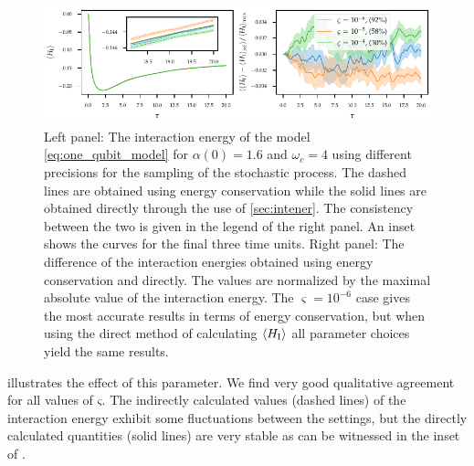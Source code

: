 \begin{figure}[htp]
  \centering
  \includegraphics{figs/one_bath_syst/stocproc_systematics_interaction}
  \caption{\label{fig:stocproc_systematics} Left panel: The
    interaction energy of the model \cref{eq:one_qubit_model} for
    \(α(0)=1.6\) and \(ω_c=4\) using different precisions for the
    sampling of the stochastic process. The dashed lines are obtained
    using energy conservation while the solid lines are obtained
    directly through the use of \cref{sec:intener}. The consistency between
    the two is given in the legend of the right panel. An inset shows
    the curves for the final three time units. Right panel: The
    difference of the interaction energies obtained using energy
    conservation and directly. The values are normalized by the
    maximal absolute value of the interaction energy. The
    \(\varsigma = 10^{-6}\) case gives the most accurate results in
    terms of energy conservation, but when using the direct method of
    calculating \(\ev{H_{\inter}}\) all parameter choices yield the
    same results.}
\end{figure}
 illustrates the effect of this
parameter. We find very good qualitative agreement for all values of
\(ς\). The indirectly calculated values (dashed lines) of the
interaction energy exhibit some fluctuations between the settings, but
the directly calculated quantities (solid lines) are very stable as can
be witnessed in the inset of .

